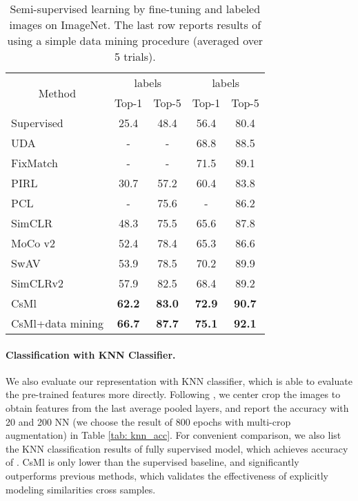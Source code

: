 \documentclass[10pt,twocolumn,letterpaper]{article}
\begin{document}
\begin{table}[t]
\renewcommand\arraystretch{1.2}
\caption{Semi-supervised learning by fine-tuning  and  labeled images on ImageNet. The last row reports results of using a simple data mining procedure (averaged over 5 trials).}
\vspace{0.05in}
\centering
\setlength{\tabcolsep}{2.2mm}
\begin{tabular}{lcccc}
\toprule
\multicolumn{1}{c}{\multirow{2}{*}{Method}} & \multicolumn{2}{c}{ labels} & \multicolumn{2}{c}{ labels} \\
\multicolumn{1}{c}{}            & Top-1  & Top-5    & Top-1  & Top-5 \\\toprule
Supervised                      & 25.4   & 48.4     & 56.4   & 80.4  \\ \midrule
UDA\cite{xie2019unsupervised}   & -      & -        & 68.8   & 88.5  \\
FixMatch\cite{sohn2020fixmatch} & -      & -        & 71.5   & 89.1  \\
PIRL\cite{misra2020self}        & 30.7   & 57.2     & 60.4   & 83.8  \\
PCL\cite{li2020prototypical}    & -      & 75.6     & -      & 86.2 \\
SimCLR\cite{chen2020simple}     & 48.3   & 75.5     & 65.6   & 87.8 \\
MoCo v2\cite{chen2020improved}  & 52.4   & 78.4     & 65.3   & 86.6 \\
SwAV\cite{caron2020unsupervised}        & 53.9   & 78.5     & 70.2   & 89.9  \\
SimCLRv2\cite{chen2020big}      & 57.9   & 82.5     & 68.4   & 89.2 \\
\midrule
CsMl                            & \textbf{62.2}   & \textbf{83.0}     & \textbf{72.9}   &\textbf{90.7}   \\
CsMl+data mining                            & \textbf{66.7}   & \textbf{87.7}     & \textbf{75.1}   &\textbf{92.1}   \\
\bottomrule
\end{tabular}
\label{tab:semi_imagenet}
\end{table}

\paragraph{Classification with KNN Classifier.} We also evaluate our representation with KNN classifier, which is able to evaluate the pre-trained features more directly. Following \cite{caron2020unsupervised}, we center crop the images to obtain features from the last average pooled layers, and report the accuracy with 20 and 200 NN (we choose the result of 800 epochs with multi-crop augmentation) in Table \ref{tab: knn_acc}. For convenient comparison, we also list the KNN classification results of fully supervised model, which achieves accuracy of . CsMl is only  lower than the supervised baseline, and significantly outperforms previous methods, which validates the effectiveness of explicitly modeling similarities cross samples.
\end{document}

